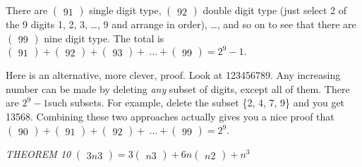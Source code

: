 \documentclass[10pt,letter]{article}
\begin{document}
There are \(\begin{pmatrix}
9
1
\end{pmatrix}
\) single digit type, \(\begin{pmatrix}
9
2
\end{pmatrix}
\) double digit type (just select 2 of the 9 digits 1, 2,
3, \ldots{}, 9 and arrange in order), \ldots{}, and so on to see that
there are \(\begin{pmatrix}
9
9
\end{pmatrix}
\) nine digit type. The total is \(\begin{pmatrix}
9
1
\end{pmatrix}
 +
\begin{pmatrix}
9
2
\end{pmatrix}
 +
\begin{pmatrix}
9
3
\end{pmatrix}
 + \ \ldots +
\begin{pmatrix}
9
9
\end{pmatrix}
 = 2^{9} - 1.\)

Here is an alternative, more clever, proof. Look at 123456789. Any
increasing number can be made by deleting \emph{any} subset of digits,
except all of them. There are \(2^{9} - 1\)such subsets. For example,
delete the subset \{2, 4, 7, 9\} and you get 13568. Combining these two
approaches actually gives you a nice proof that \(\begin{pmatrix}
9
0
\end{pmatrix}
 +
\begin{pmatrix}
9
1
\end{pmatrix}
 +
\begin{pmatrix}
9
2
\end{pmatrix}
 + \ \ldots +
\begin{pmatrix}
9
9
\end{pmatrix}
 = 2^{9}\).

\emph{THEOREM 10} \(\begin{pmatrix}
3n
3
\end{pmatrix}
 = 3
\begin{pmatrix}
n
3
\end{pmatrix}
 + 6n
\begin{pmatrix}
n
2
\end{pmatrix}
 + n^{3}\)
\end{document}
